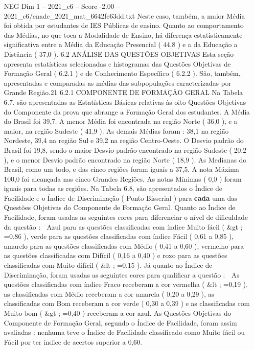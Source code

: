 \begin{textsample}{NEG Dim 1 – 2021\_c6 – Score -2.00 – 2021\_c6/enade\_2021\_mat\_6642fe63dd.txt}
Neste caso, também, a maior Média foi obtida por estudantes de IES Públicas de ensino.
Quanto ao comportamento das Médias, no que toca a Modalidade de Ensino, há diferença estatisticamente significativa entre a Média da Educação Presencial ( 44,8 ) e a da Educação a Distância ( 37,0 ). 6.2 ANÁLISE DAS QUESTÕES OBJETIVAS Esta seção apresenta estatísticas selecionadas e histogramas das Questões Objetivas de Formação Geral ( 6.2.1 ) e de Conhecimento Específico ( 6.2.2 ).
São, também, apresentadas e comparadas as médias das subpopulações caracterizadas por Grande Região.21 6.2.1 COMPONENTE DE FORMAÇÃO GERAL Na Tabela 6.7, são apresentadas as Estatísticas Básicas relativas às oito Questões Objetivas do Componente da prova que abrange a Formação Geral dos estudantes.
A Média do Brasil foi 39,7.
A menor Média foi encontrada na região Norte ( 36,0 ), e a maior, na região Sudeste ( 41,9 ).
As demais Médias foram : 38,1 na região Nordeste, 39,4 na região Sul e 39,2 na região Centro-Oeste.
O Desvio padrão do Brasil foi 19,8, sendo o maior Desvio padrão encontrado na região Sudeste ( 20,2 ), e o menor Desvio padrão encontrado na região Norte ( 18,9 ).
As Medianas do Brasil, como um todo, e das cinco regiões foram iguais a 37,5.
A nota Máxima 100,0 foi alcançada nas cinco Grandes Regiões.
As notas Mínimas ( 0,0 ) foram iguais para todas as regiões.
Na Tabela 6.8, são apresentados o Índice de Facilidade e o Índice de Discriminação ( Ponto-Bisserial ) para \textbf{cada} uma das Questões Objetivas do Componente de Formação Geral.
Quanto ao Índice de Facilidade, foram usadas as seguintes cores para diferenciar o nível de dificuldade da questão :  Azul para as questões classificadas com índice Muito fácil ( \&gt ; =0,86 ), verde para as questões classificadas com índice Fácil ( 0,61 a 0,85 ), amarelo para as questões classificadas com Médio ( 0,41 a 0,60 ), vermelho para as questões classificadas com Difícil ( 0,16 a 0,40 ) e roxo para as questões classificadas com Muito difícil ( \&lt ; =0,15 ).
Já quanto ao Índice de Discriminação, foram usadas as seguintes cores para qualificar a questão :  As questões classificadas com índice Fraco receberam a cor vermelha ( \&lt ; =0,19 ), as classificadas com Médio receberam a cor amarela ( 0,20 a 0,29 ), as classificadas com Bom receberam a cor verde ( 0,30 a 0,39 ) e as classificadas com Muito bom ( \&gt ; =0,40 ) receberam a cor azul.
As Questões Objetivas do Componente de Formação Geral, segundo o Índice de Facilidade, foram assim avaliadas : nenhuma teve o Índice de Facilidade classificado como Muito fácil ou Fácil por ter índice de acertos superior a 0,60.

\end{textsample}
